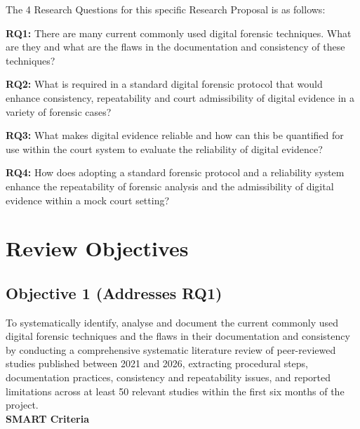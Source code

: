 \documentclass[a4paper]{report}
\begin{document}
\begin{justify}
The 4 Research Questions for this specific Research Proposal is as follows:

\vspace{0.2cm}

\textbf{RQ1:} There are many current commonly used digital forensic techniques. What are they and what are the flaws in the documentation and consistency of these techniques?

\vspace{0.2cm}

\textbf{RQ2:} What is required in a standard digital forensic protocol that would enhance consistency, repeatability and court admissibility of digital evidence in a variety of forensic cases?

\vspace{0.2cm}

\textbf{RQ3:} What makes digital evidence reliable and how can this be quantified for use within the court system to evaluate the reliability of digital evidence?

\vspace{0.2cm}

\textbf{RQ4:} How does adopting a standard forensic protocol and a reliability system enhance the repeatability of forensic analysis and the admissibility of digital evidence within a mock court setting?



\chapter{Review Objectives}

\section{Objective 1 (Addresses RQ1)}

To systematically identify, analyse and document the current commonly used digital forensic techniques and the flaws in their documentation and consistency by conducting a comprehensive systematic literature review of peer-reviewed studies published between 2021 and 2026, extracting procedural steps, documentation practices, consistency and repeatability issues, and reported limitations across at least 50 relevant studies within the first six months of the project.
\\
\textbf{SMART Criteria}


\end{justify}
\end{document}
